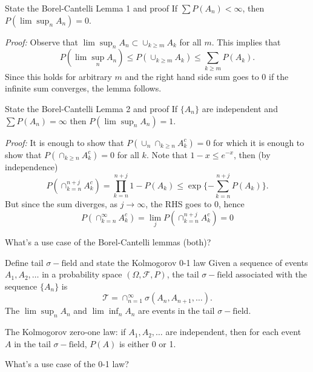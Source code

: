 \documentclass[avery5388,grid,frame]{flashcards}
\newcommand{\sigf}{\sigma-\text{field}}
\newcommand{\F}{\mathcal F}
\begin{document}
\begin{flashcard}
    {State the Borel-Cantelli Lemma 1 and proof}
    If $\sum P(A_n) < \infty$, then $P(\lim \sup_n A_n) = 0$.

    \emph{Proof:} Observe that $\lim \sup_n A_n \subset \cup_{k \geq m} A_k$ for all $m$.
    This implies that
    $$P(\lim \sup_n A_n) \leq P(\cup_{k \geq m} A_k) \leq \sum_{k \geq m} P(A_k).$$
    Since this holds for arbitrary $m$ and the right hand side sum goes to $0$ if the infinite sum converges, the lemma follows.
\end{flashcard}


\begin{flashcard}
    {State the Borel-Cantelli Lemma 2 and proof}
    If $\{ A_n \}$ are independent and $\sum P(A_n) = \infty$ then $P(\lim \sup_n A_n) = 1$.

    \emph{Proof:} It is enough to show that $P(\cup_n \cap_{k \geq n} A_k^c) = 0$ for which it is enough to show that $P(\cap_{k \geq n} A_k^c) = 0$ for all $k$. Note that $1 - x \leq e^{-x}$, then (by independence)
    $$P(\cap_{k = n}^{n + j} A_k^c) = \prod_{k = n}^{n+j} 1 - P(A_k) \leq \exp \{ - \sum_{k = n}^{n + j} P(A_k) \}.$$
    But since the sum diverges, as $j \rightarrow \infty$, the RHS goes to 0, hence
    $$P( \cap_{k=n}^\infty A_k^c ) = \lim_j P(\cap_{k=n}^{n+j} A_k^c) = 0$$
\end{flashcard}

\begin{flashcard}
    {What's a use case of the Borel-Cantelli lemmas (both)?}
\end{flashcard}


\begin{flashcard}
    {Define tail $\sigf$ and state the Kolmogorov 0-1 law}
    Given a sequence of events $A_1, A_2, \dots$ in a probability space $(\Omega, \F, P)$, the tail $\sigf$ associated with the sequence $\{ A_n \}$ is
    $$\mathcal T = \cap_{n=1}^\infty \sigma(A_n, A_{n+1}, \dots).$$
    The $\lim \sup_n A_n$ and $\lim \inf_n A_n$ are events in the tail $\sigf$.

    The Kolmogorov zero-one law: if $A_1, A_2, \dots$ are independent, then for each event $A$ in the tail $\sigf$, $P(A)$ is either 0 or 1.
\end{flashcard}


\begin{flashcard}
    {What's a use case of the 0-1 law?}
\end{flashcard}
\end{document}
